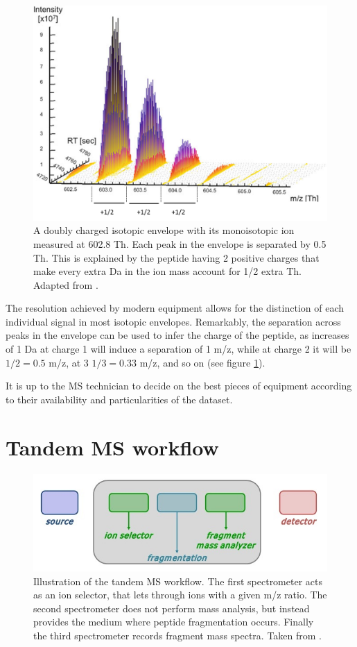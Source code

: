 \documentclass[11pt, a4paper]{report}
\begin{document}
\begin{figure}[!h]
\includegraphics[width=\textwidth]{envelope}
\caption{A doubly charged isotopic envelope with its monoisotopic ion measured at 602.8 Th. Each peak in the envelope is separated by 0.5 Th. This is explained by the peptide having 2 positive charges that make every extra Da in the ion mass account for 1/2 extra Th. Adapted from \cite{Mirzaei2016}.}
\label{fig:envelope}
\end{figure}


The resolution achieved by modern equipment allows for the distinction of each individual signal in most isotopic envelopes. Remarkably, the separation across peaks in the envelope can be used to infer the charge of the peptide, as increases of 1 Da at charge 1 will induce a separation of 1 \ac{m/z}, while at charge 2 it will be $1/2 = 0.5$ \ac{m/z}, at 3 $1/3 = 0.33$ \ac{m/z}, and so on (see figure \ref{fig:envelope}).

It is up to the \ac{MS} technician to decide on the best pieces of equipment according to their availability and particularities of the dataset.

\section{Tandem MS workflow}
\label{sec:tandem_ms_workflow}

\begin{figure}[!h]
\includegraphics[width=\textwidth]{tandem_ms}
\caption[]{Illustration of the tandem MS workflow. The first spectrometer acts as an ion selector, that lets through ions with a given \ac{m/z} ratio. The second spectrometer does not perform mass analysis, but instead provides the medium where peptide fragmentation occurs. Finally the third spectrometer records fragment mass spectra. Taken from \footnotemark{}.}
\label{fig:tandem_ms}
\end{figure}
\end{document}
